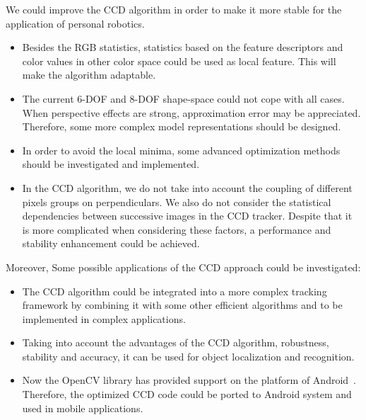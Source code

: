 We could improve the CCD algorithm in order to make it
more stable for the application of personal robotics.
\begin{itemize}
\item Besides the RGB statistics, statistics based on the feature
  descriptors and color values in other color space could be used as
  local feature. This will make the algorithm adaptable.
\item The current 6-DOF and 8-DOF shape-space could not cope with all
  cases. When perspective effects are strong, approximation error
may be appreciated. Therefore, some more complex model representations
should be designed.
\item In order to avoid the local minima, some advanced optimization
  methods should be investigated and implemented.
\item In the CCD algorithm, we do not take into account
  the coupling of different pixels groups on perpendiculars. We also
  do not consider the statistical dependencies between successive
  images in the CCD tracker. Despite that it is more
  complicated when considering these factors, a performance and
  stability enhancement could be achieved.
\end{itemize}

Moreover, Some possible applications of the CCD approach could be
investigated:
\begin{itemize}
\item The CCD algorithm could be integrated into a more complex
  tracking framework by combining it with some other efficient
  algorithms and to be implemented in complex applications.
\item Taking into account the advantages of the CCD algorithm,
  robustness, stability and accuracy, it can be used for object
  localization and recognition.
\item Now the OpenCV library has provided support on the platform of
  Android~\cite{android}. Therefore, the optimized CCD code could be ported to
  Android system and used in mobile applications.
\end{itemize}
